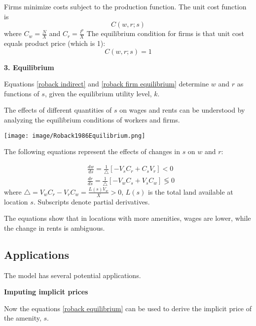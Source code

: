 \documentclass{article}
\numberwithin{equation}{section} %
\begin{document}
Firms minimize costs subject to the production function. The unit cost function is 
\begin{equation}
  C(w, r; s) \label{roback cost function}
\end{equation}
where $C_w=\frac{N}{X}$ and $C_r=\frac{l^p}{X}$
The equilibrium condition for firms is that unit cost equals product price (which is 1):
\begin{equation}
  C(w,r;s)=1 \label{roback firm equilibrium}
\end{equation}

\textbf{3. Equilibrium}

Equations \ref{roback indirect} and \ref{roback firm equilibrium} determine $w$ and $r$ as functions of $s$, given the equilibrium utility level, $k$.

The effects of different quantities of $s$ on wages and rents can be understood by analyzing the equilibrium conditions of workers and firms.

\texttt{[image: image/Roback1986Equilibrium.png]}

The following equations represent the effects of changes in $s$ on $w$ and $r$:

\begin{equation}
\begin{split}
&\frac{dw}{ds} = \frac{1}{\triangle}[-V_s C_r + C_s V_r] < 0
\\&\frac{dr}{ds} = \frac{1}{\triangle}[-V_wC_s + V_sC_w] \lessgtr 0
\end{split}
\label{roback equilibrium}
\end{equation}
where $\triangle = V_w C_r - V_r C_w = \frac{L(s) V_w}{X}>0$, $L(s)$ is the total land available at location $s$. Subscripts denote partial derivatives.



The equations show that in locations with more amenities, wages are lower, while the change in rents is ambiguous.

\subsection{Applications} %
\label{sub:applications}

The model has several potential applications.

\textbf{Imputing implicit prices}

Now the equations \ref{roback equilibrium} can be used to derive the implicit price of the amenity, $s$.
\end{document}
